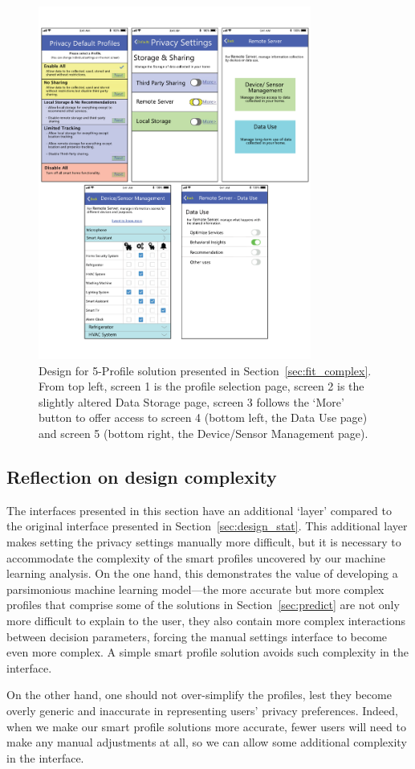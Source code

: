 \begin{figure}
	\centering
	\includegraphics[width=0.8\textwidth]{figures/cluster_complex.pdf}
	\caption{Design for 5-Profile solution presented in Section~\ref{sec:fit_complex}. From top left, screen 1 is the profile selection page, screen 2 is the slightly altered Data Storage page, screen 3 follows the `More' button to offer access to screen 4 (bottom left, the Data Use page) and screen 5 (bottom right, the Device/Sensor Management page).}
	\label{fig:cluster_complex}
\end{figure}

\subsection{Reflection on design complexity}
The interfaces presented in this section have an additional `layer' compared to the original interface presented in Section~\ref{sec:design_stat}. This additional layer makes setting the privacy settings manually more difficult, but it is necessary to accommodate the complexity of the smart profiles uncovered by our machine learning analysis. On the one hand, this demonstrates the value of developing a parsimonious machine learning model---the more accurate but more complex profiles that comprise some of the solutions in Section~\ref{sec:predict} are not only more difficult to explain to the user, they also contain more complex interactions between decision parameters, forcing the manual settings interface to become even more complex. A simple smart profile solution avoids such complexity in the interface. 

On the other hand, one should not over-simplify the profiles, lest they become overly generic and inaccurate in representing users' privacy preferences. Indeed, when we make our smart profile solutions more accurate, fewer users will need to make any manual adjustments at all, so we can allow some additional complexity in the interface.